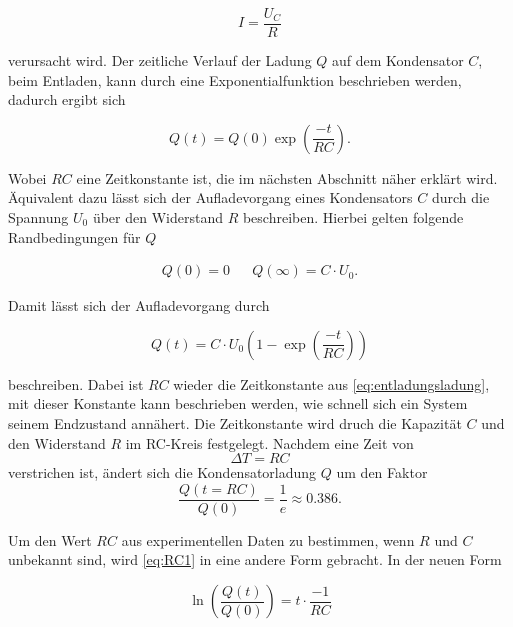 \begin{equation}
    \label{eq:ohmschesgesetz}
    I = \frac{U_C}{R}
\end{equation}

verursacht wird. 
Der zeitliche Verlauf der Ladung $Q$ auf dem Kondensator $C$, beim Entladen, kann durch eine Exponentialfunktion beschrieben werden, dadurch ergibt sich

\begin{equation}
    \label{eq:entladungsladung}
    Q (t) = Q (0) \exp{\left(\frac{-t}{RC} \right)}.
\end{equation}

Wobei $RC$ eine Zeitkonstante ist, die im nächsten Abschnitt näher erklärt wird. \cite{V353}
Äquivalent dazu lässt sich der Aufladevorgang eines Kondensators $C$ durch die Spannung $U_0$ über den Widerstand $R$ beschreiben. Hierbei gelten folgende Randbedingungen für $Q$

\begin{align}
    \label{eq:ladung}
    Q (0) = 0 && Q (\infty) = C \cdot U_0.
\end{align}

Damit lässt sich der Aufladevorgang durch

\begin{equation}
    \label{eq:aufladungsladung}
    Q (t) = C \cdot U_0  (1- \exp{\left(\frac{-t}{RC} \right)} )
\end{equation}

beschreiben. \cite{V353} Dabei ist $RC$ wieder die Zeitkonstante aus \autoref{eq:entladungsladung}, mit dieser Konstante kann beschrieben werden, wie schnell sich ein System seinem Endzustand annähert. Die Zeitkonstante wird druch die Kapazität $C$ und den Widerstand $R$ im RC-Kreis festgelegt. Nachdem eine Zeit von 
\begin{equation}
    \Delta T = RC
\end{equation} verstrichen ist, ändert sich die Kondensatorladung $Q$ um den Faktor
\begin{equation}
    \label{eq:RC1}
    \frac{Q (t = RC)}{Q (0)} = \frac{1}{e} \approx 0.386.
\end{equation}

Um den Wert $RC$ aus experimentellen Daten zu bestimmen, wenn $R$ und $C$ unbekannt sind, wird \autoref{eq:RC1} in eine andere Form gebracht. In der neuen Form

\begin{equation}
    \label{eq:RC2}
    \ln \left( \frac{Q (t)}{Q (0)} \right) = t \cdot \frac{-1}{RC}
\end{equation}

